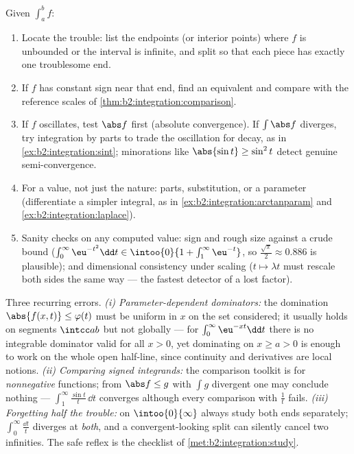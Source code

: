 \begin{method}\label{met:b2:integration:study}
Given $\int_a^b f$:
\begin{enumerate}
  \item Locate the trouble: list the endpoints (or interior
        points) where $f$ is unbounded or the interval is
        infinite, and split so that each piece has exactly one
        troublesome end.
  \item If $f$ has constant sign near that end, find an
        equivalent and compare with the reference scales of
        \cref{thm:b2:integration:comparison}.
  \item If $f$ oscillates, test $\abs f$ first (absolute
        convergence). If $\int\abs f$ diverges, try integration
        by parts to trade the oscillation for decay, as in
        \cref{ex:b2:integration:sint}; minorations like
        $\abs{\sin t} \geq \sin^2t$ detect genuine
        semi-convergence.
  \item For a value, not just the nature: parts, substitution,
        or a parameter (differentiate a simpler integral, as in
        \cref{ex:b2:integration:arctanparam} and
        \cref{ex:b2:integration:laplace}).
  \item Sanity checks on any computed value: sign and rough
        size against a crude bound ($\int_0^\infty
        \eu^{-t^2}\dd t \in \intoo{0}{1 + \int_1^\infty
        \eu^{-t}}$, so $\frac{\sqrt\pi}{2} \approx 0.886$ is
        plausible); and dimensional consistency under scaling
        ($t \mapsto \lambda t$ must rescale both sides the
        same way --- the fastest detector of a lost factor).
\end{enumerate}
\end{method}

\begin{remark}
Three recurring errors. \emph{(i) Parameter-dependent
dominators:} the domination $\abs{f(x,t)} \leq \varphi(t)$ must
be uniform in $x$ on the set considered; it usually holds on
segments $\intcc ab$ but not globally --- for
$\int_0^\infty\eu^{-xt}\dd t$ there is no integrable dominator
valid for all $x > 0$, yet dominating on $x \geq a > 0$ is
enough to work on the whole open half-line, since continuity
and derivatives are local notions. \emph{(ii) Comparing signed
integrands:} the comparison toolkit is for \emph{nonnegative}
functions; from $\abs f \leq g$ with $\int g$ divergent one may
conclude nothing --- $\int_1^\infty\frac{\sin t}t\,\dd t$
converges although every comparison with $\frac1t$ fails.
\emph{(iii) Forgetting half the trouble:} on
$\intoo{0}{\infty}$ always study both ends separately;
$\int_0^\infty\frac{\dd t}{t}$ diverges at \emph{both}, and a
convergent-looking split can silently cancel two infinities.
The safe reflex is the checklist of
\cref{met:b2:integration:study}.
\end{remark}

